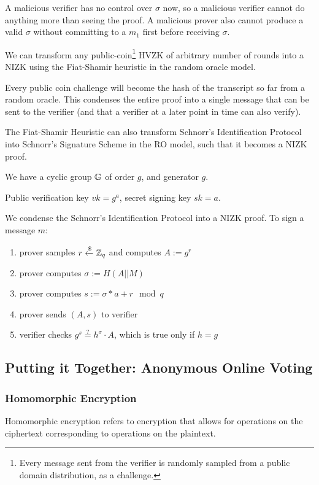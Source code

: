 A malicious verifier has no control over $\sigma$ now, so a malicious verifier cannot do anything more than seeing the proof. A malicious prover also cannot produce a valid $\sigma$ without committing to a $m_1$ first before receiving $\sigma$.

We can transform any public-coin\footnote{Every message sent from the verifier is randomly sampled from a public domain distribution, as a challenge.} HVZK of arbitrary number of rounds into a NIZK using the Fiat-Shamir heuristic in the random oracle model.

Every public coin challenge will become the hash of the transcript so far from a random oracle. This condenses the entire proof into a single message that can be sent to the verifier (and that a verifier at a later point in time can also verify).

\begin{example}
    The Fiat-Shamir Heuristic can also transform Schnorr's Identification Protocol into Schnorr's Signature Scheme in the RO model, such that it becomes a NIZK proof.

    We have a cyclic group $\mathbb G$ of order $g$, and generator $g$.

    Public verification key $vk = g^a$, secret signing key $sk = a$.

    We condense the Schnorr's Identification Protocol into a NIZK proof. To sign a message $m$:
    \begin{enumerate}
        \item prover samples $r \xleftarrow{\$} \mathbb Z_q$ and computes $A := g^r$
        \item prover computes $\sigma := H(A||M)$
        \item prover computes $s := \sigma * a + r \mod{q}$
        \item prover sends $(A, s)$ to verifier
        \item verifier checks $g^s \stackrel{?}{=} h^\sigma \cdot A$, which is true only if $h = g$
    
    \end{enumerate}
\end{example}

\subsection{Putting it Together: Anonymous Online Voting}

\subsubsection{Homomorphic Encryption}
Homomorphic encryption refers to encryption that allows for operations on the ciphertext corresponding to operations on the plaintext.

